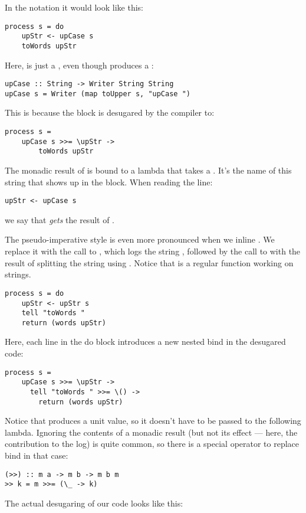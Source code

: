 In the  notation it would look like this:

\begin{verbatim}
process s = do 
    upStr <- upCase s
    toWords upStr
\end{verbatim}
Here,  is just a , even though
 produces a :

\begin{verbatim}
upCase :: String -> Writer String String
upCase s = Writer (map toUpper s, "upCase ")
\end{verbatim}
This is because the  block is desugared by the compiler to:

\begin{verbatim}
process s = 
    upCase s >>= \upStr ->
        toWords upStr
\end{verbatim}
The monadic result of  is bound to a lambda that takes a
. It's the name of this string that shows up in the
 block. When reading the line:

\begin{verbatim}
upStr <- upCase s
\end{verbatim}
we say that  \emph{gets} the result of .

The pseudo-imperative style is even more pronounced when we inline
. We replace it with the call to , which
logs the string , followed by the call to
 with the result of splitting the string 
using . Notice that  is a regular function
working on strings.

\begin{verbatim}
process s = do
    upStr <- upStr s
    tell "toWords "
    return (words upStr)
\end{verbatim}
Here, each line in the do block introduces a new nested bind in the
desugared code:

\begin{verbatim}
process s =
    upCase s >>= \upStr ->
      tell "toWords " >>= \() ->
        return (words upStr)
\end{verbatim}
Notice that  produces a unit value, so it doesn't have to
be passed to the following lambda. Ignoring the contents of a monadic
result (but not its effect --- here, the contribution to the log) is
quite common, so there is a special operator to replace bind in that
case:

\begin{verbatim}
(>>) :: m a -> m b -> m b m
>> k = m >>= (\_ -> k)
\end{verbatim}
The actual desugaring of our code looks like this:

